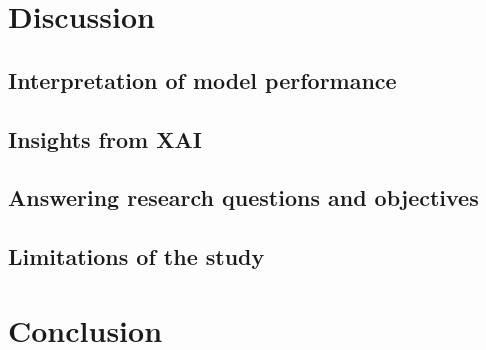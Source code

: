 \documentclass[
  pdftex,
  10pt,
  a4paper,
  oneside
]{article}
\begin{document}
  

  

  \newpage

  \section{Discussion}\label{sec:5-discussion}
  

  \subsection{Interpretation of model performance}
  
  

  \subsection{Insights from XAI}

  \subsection{Answering research questions and objectives}

  \subsection{Limitations of the study}

  \newpage

  \section{Conclusion}\label{sec:6-conclusion}

  \newpage

  
  

  \newpage

  
\end{document}
